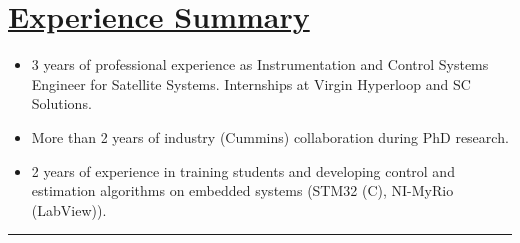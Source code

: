 \section*{\underline{Experience Summary}}
\begin{itemize}
        \item 3 years of professional experience as Instrumentation and Control Systems Engineer for Satellite Systems. Internships at Virgin Hyperloop and SC Solutions.
        \item More than 2 years of industry (Cummins) collaboration during PhD research.
        \item 2 years of experience in training students and developing control and estimation algorithms on embedded systems (STM32 (C), NI-MyRio (LabView)).
\end{itemize}

\noindent\rule{\textwidth}{0.4pt}
